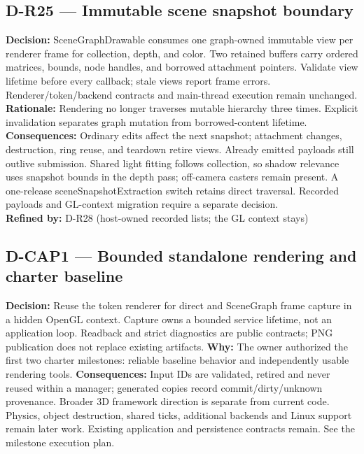 \subsection*{D-R25 --- Immutable scene snapshot boundary}
\begin{decisionbox}[title={D-R25 \quad 2026-09-17}]
\textbf{Decision:} SceneGraphDrawable consumes one graph-owned immutable view
per renderer frame for collection, depth, and color. Two retained buffers carry
ordered matrices, bounds, node handles, and borrowed attachment pointers.
Validate view lifetime before every callback; stale views report frame errors.
Renderer/token/backend contracts and main-thread execution remain unchanged.\\
\textbf{Rationale:} Rendering no longer traverses mutable hierarchy three times.
Explicit invalidation separates graph mutation from borrowed-content lifetime.\\
\textbf{Consequences:} Ordinary edits affect the next snapshot; attachment
changes, destruction, ring reuse, and teardown retire views. Already emitted
payloads still outlive submission. Shared light fitting follows collection,
so shadow relevance uses snapshot bounds in the depth pass; off-camera casters
remain present. A one-release sceneSnapshotExtraction switch retains direct
traversal. Recorded payloads and GL-context migration require a separate decision.\\
\textbf{Refined by:} D-R28 (host-owned recorded lists; the GL context stays)
\end{decisionbox}

\subsection*{D-CAP1 --- Bounded standalone rendering and charter baseline}
\begin{decisionbox}[title={D-CAP1 \quad 2026-09-11}]
\textbf{Decision:} Reuse the token renderer for direct and SceneGraph frame capture
in a hidden OpenGL context. Capture owns a bounded service lifetime, not an
application loop. Readback and strict diagnostics are public contracts; PNG
publication does not replace existing artifacts.
\textbf{Why:} The owner authorized the first two charter milestones: reliable
baseline behavior and independently usable rendering tools.
\textbf{Consequences:} Input IDs are validated, retired and never reused within
a manager; generated copies record commit/dirty/unknown provenance. Broader 3D
framework direction is separate from current code. Physics, object destruction,
shared ticks, additional backends and Linux support remain later work. Existing
application and persistence contracts remain. See the milestone execution plan.
\end{decisionbox}

